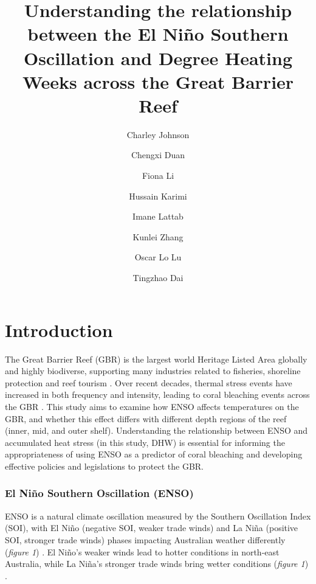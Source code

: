 \documentclass[letterpaper,9pt,twocolumn,twoside,]{pinp}
\title{Understanding the relationship between the El Niño Southern
Oscillation and Degree Heating Weeks across the Great Barrier Reef}
\author[a]{Charley Johnson}
\author[b]{Chengxi Duan}
\author[c]{Fiona Li}
\author[d]{Hussain Karimi}
\author[e]{Imane Lattab}
\author[f]{Kunlei Zhang}
\author[g]{Oscar Lo Lu}
\author[h]{Tingzhao Dai}
\affil[a]{520482628}
\affil[b]{530005104}
\affil[c]{520404414}
\affil[d]{530516493}
\affil[e]{530318646}
\affil[f]{520377451}
\affil[g]{530528429}
\affil[h]{510343068}
\begin{document}
\verticaladjustment{-2pt}

\maketitle
\thispagestyle{firststyle}



\section{Introduction}\label{introduction}

The Great Barrier Reef (GBR) is the largest world Heritage Listed Area
globally and highly biodiverse, supporting many industries related to
fisheries, shoreline protection and reef tourism \citet{Fabricius2000}.
Over recent decades, thermal stress events have increased in both
frequency and intensity, leading to coral bleaching events across the
GBR \citet{vanWoesik2022}. This study aims to examine how ENSO affects
temperatures on the GBR, and whether this effect differs with different
depth regions of the reef (inner, mid, and outer shelf). Understanding
the relationship between ENSO and accumulated heat stress (in this
study, DHW) is essential for informing the appropriateness of using ENSO
as a predictor of coral bleaching and developing effective policies and
legislations to protect the GBR.

\subsubsection{El Niño Southern Oscillation
(ENSO)}\label{el-niuxf1o-southern-oscillation-enso}

ENSO is a natural climate oscillation measured by the Southern
Oscillation Index (SOI), with El Niño (negative SOI, weaker trade winds)
and La Niña (positive SOI, stronger trade winds) phases impacting
Australian weather differently (\emph{figure 1}) \citet{Lough1994}. El
Niño's weaker winds lead to hotter conditions in north-east Australia,
while La Niña's stronger trade winds bring wetter conditions
(\emph{figure 1}) \citet{McGowanTheobald2017}.
\end{document}
